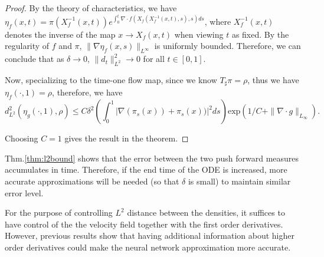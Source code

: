 \begin{proof}
By the theory of characteristics, we have $\eta_f(x,t) = \pi(X^{-1}_f(x,t))e^{\int_0^t\nabla\cdot f(X_f(X^{-1}_f(x,t), s), s)ds}$, where $X^{-1}_f(x,t)$ denotes the inverse of the map $x\rightarrow X_f(x,t)$ when viewing $t$ as fixed. By the regularity of $f$ and $\pi$,  $\|\nabla\eta_f(x,s)\|_{L^\infty}$ is uniformly bounded. Therefore, we can conclude that as $\delta \rightarrow 0$, $\|d_t\|_{L^2}^2 \rightarrow 0$ for all $t\in[0,1]$. 

Now, specializing to the time-one flow map, since we know $T_\sharp\pi = \rho$, thus we have $\eta_f(\cdot,1) = \rho$, therefore, we have 
$$d_{L^2}^2(\eta_g(\cdot,1), \rho) \leq C\delta^2(\int_0^1|\nabla(\pi_s(x)) + \pi_s(x))|^2ds)\text{exp}(1/C+ \|\nabla\cdot  g\|_{L_\infty}).$$

Choosing $C = 1$ gives the result in the theorem. 





\end{proof}{}

\begin{remark}
Thm.\ref{thm:l2bound} shows that the error between the two push forward measures accumulates in time. Therefore, if the end time of the ODE is increased, more accurate approximations will be needed (so that $\delta$ is small) to maintain similar error level.


\end{remark}
\begin{remark}
For the purpose of controlling $L^2$ distance between the densities, it suffices to have control of the the velocity field together with the first order derivatives. However, previous results show that having additional information about higher order derivatives could make the neural network approximation more accurate. 
\end{remark}


